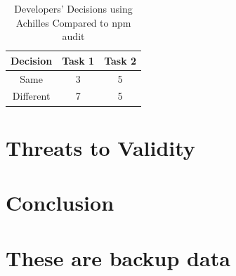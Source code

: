 \documentclass[conference]{IEEEtran}
\begin{document}
	\begin{table}[tb]
		\centering
		\caption{Developers' Decisions using Achilles Compared to npm audit}
		\begin{tabular}{ccc} 
			\toprule
			Decision & Task 1 & Task 2 \\
			\midrule
			Same & 3 & 5\\ 
			Different & 7 & 5 \\
			\bottomrule
		\end{tabular}
		\label{table:x3}
	\end{table}
	
	\section{Threats to Validity}
	
	\section{Conclusion}
	
	
	
	
	\clearpage
	
	\section{These are backup data}
	
\end{document}
